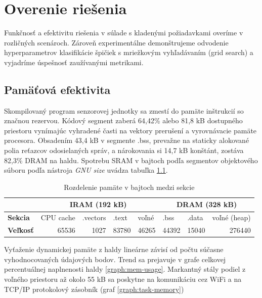 \chapter{Overenie riešenia} \label{chapter:verification}
Funkčnosť a efektivitu riešenia v súlade s kladenými požiadavkami overíme v rozličných scenároch. Zároveň experimentálne
demonštrujeme odvodenie hyperparametrov klasifikácie špičiek s mriežkovým vyhľadávaním (grid search)
a vyjadríme úspešnosť zaužívanými metrikami.

\section{Pamäťová efektivita}
Skompilovaný program senzorovej jednotky sa zmestí do pamäte inštrukcií so značnou rezervou. Kódový segment zaberá
64,42\% alebo 81,8 kB dostupného priestoru vynímajúc vyhradené časti na vektory prerušení a vyrovnávacie pamäte procesora.
Obsadením 43,4 kB v segmente .bss, prevažne na staticky alokované polia reťazcov odosielaných správ, a nárokovania si 14,7 kB
konštánt, zostáva 82,3\% DRAM na haldu. Spotrebu SRAM v bajtoch podľa segmentov objektového súboru podľa nástroja
\emph{GNU size} uvádza tabuľka \ref{tab:ram-segments}.
\begin{table}[h]
\def\arraystretch{1.25}
\begin{tabular}{|l|llll|lll|}
\hline
                     & \multicolumn{4}{c|}{\textbf{IRAM (192 kB)}}                                                                              & \multicolumn{3}{c|}{\textbf{DRAM (328 kB)}}                                           \\ \hline
\textbf{Sekcia}      & \multicolumn{1}{l|}{CPU cache} & \multicolumn{1}{l|}{.vectors} & \multicolumn{1}{l|}{.text} & voľné                      & \multicolumn{1}{l|}{.bss}  & \multicolumn{1}{l|}{.data} & voľné (heap)                \\ \hline
\textbf{Veľkosť} & \multicolumn{1}{r|}{65536}     & \multicolumn{1}{r|}{1027}     & \multicolumn{1}{r|}{83780} & \multicolumn{1}{r|}{46265} & \multicolumn{1}{r|}{44392} & \multicolumn{1}{r|}{15040} & \multicolumn{1}{r|}{276440} \\ \hline
\end{tabular}
\caption{Rozdelenie pamäte v bajtoch medzi sekcie}
\label{tab:ram-segments}
\end{table}

Vyťaženie dynamickej pamäte z haldy lineárne závisí od počtu súčasne vyhodnocovaných údajových bodov. Trend sa prejavuje v grafe
celkovej percentuálnej naplnenosti haldy \ref{graph:mem-usage}. Markantný stály podiel z voľného priestoru až okolo 55 kB sa poskytne na komunikáciu cez WiFi a na TCP/IP protokolový zásobník (graf \ref{graph:task-memory})

